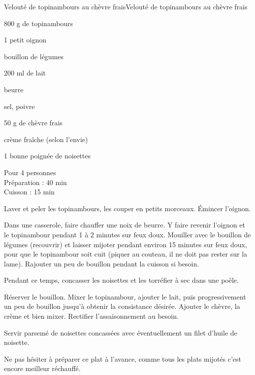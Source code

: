 \begin{recette}{Velouté de topinambours au chèvre frais}{Velouté de topinambours au chèvre frais}

\begin{ingredients}
800 g de topinambours\par
1 petit oignon\par
bouillon de légumes\par
200 ml de lait\par
beurre\par
sel, poivre\par
50 g de chèvre frais\par
crème fraîche (selon l'envie)\par
1 bonne poignée de noisettes\par
\end{ingredients}

\begin{infos}
Pour 4 personnes\\
Préparation : 40 min\\
Cuisson : 15 min\\
\end{infos}

\begin{etapes}
\item Laver et peler les topinambours, les couper en petits morceaux. Émincer l'oignon.
\item Dans une casserole, faire chauffer une noix de beurre. Y faire revenir l'oignon et le topinambour pendant 1 à 2 minutes sur feux doux. Mouiller avec le bouillon de légumes (recouvrir) et laisser mijoter pendant environ 15 minutes sur feux doux, pour que le topinambour soit cuit (piquer au couteau, il ne doit pas rester sur la lame). Rajouter un peu de bouillon pendant la cuisson si besoin.
\item Pendant ce temps, concasser les noisettes et les torréfier à sec dans une poêle.
\item Réserver le bouillon. Mixer le topinambour, ajouter le lait, puis progressivement un peu de bouillon jusqu'à obtenir la consistance désirée. Ajouter le chèvre, la crème et bien mixer. Rectifier l'assaisonnement au besoin.
\item Servir parsemé de noisettes concassées avec éventuellement un filet d'huile de noisette.
\end{etapes}

\begin{conseils}
Ne pas hésiter à préparer ce plat à l'avance, comme tous les plats mijotés c'est encore meilleur réchauffé.
\end{conseils}

\end{recette}